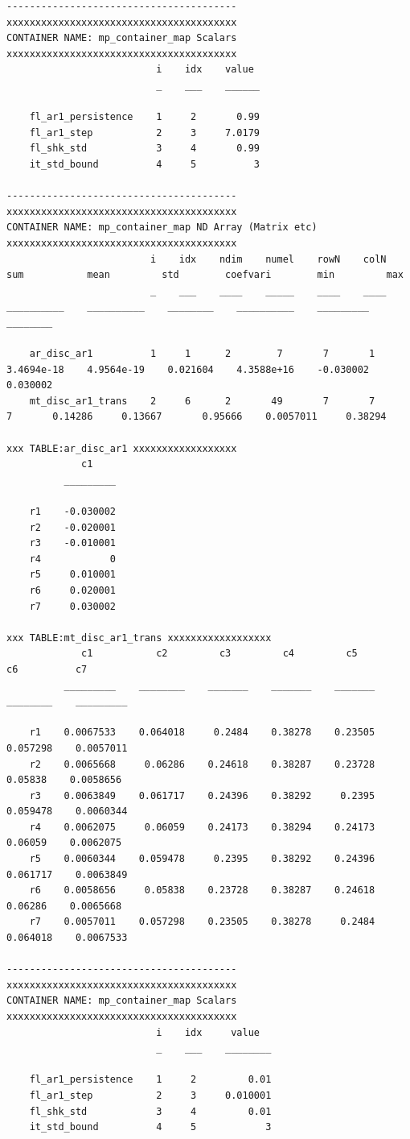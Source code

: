 \documentclass[
]{book}
\begin{document}
\begin{verbatim}
----------------------------------------
xxxxxxxxxxxxxxxxxxxxxxxxxxxxxxxxxxxxxxxx
CONTAINER NAME: mp_container_map Scalars
xxxxxxxxxxxxxxxxxxxxxxxxxxxxxxxxxxxxxxxx
                          i    idx    value 
                          _    ___    ______

    fl_ar1_persistence    1     2       0.99
    fl_ar1_step           2     3     7.0179
    fl_shk_std            3     4       0.99
    it_std_bound          4     5          3

----------------------------------------
xxxxxxxxxxxxxxxxxxxxxxxxxxxxxxxxxxxxxxxx
CONTAINER NAME: mp_container_map ND Array (Matrix etc)
xxxxxxxxxxxxxxxxxxxxxxxxxxxxxxxxxxxxxxxx
                         i    idx    ndim    numel    rowN    colN       sum           mean         std        coefvari        min         max   
                         _    ___    ____    _____    ____    ____    __________    __________    ________    __________    _________    ________

    ar_disc_ar1          1     1      2        7       7       1      3.4694e-18    4.9564e-19    0.021604    4.3588e+16    -0.030002    0.030002
    mt_disc_ar1_trans    2     6      2       49       7       7               7       0.14286     0.13667       0.95666    0.0057011     0.38294

xxx TABLE:ar_disc_ar1 xxxxxxxxxxxxxxxxxx
             c1    
          _________

    r1    -0.030002
    r2    -0.020001
    r3    -0.010001
    r4            0
    r5     0.010001
    r6     0.020001
    r7     0.030002

xxx TABLE:mt_disc_ar1_trans xxxxxxxxxxxxxxxxxx
             c1           c2         c3         c4         c5          c6          c7    
          _________    ________    _______    _______    _______    ________    _________

    r1    0.0067533    0.064018     0.2484    0.38278    0.23505    0.057298    0.0057011
    r2    0.0065668     0.06286    0.24618    0.38287    0.23728     0.05838    0.0058656
    r3    0.0063849    0.061717    0.24396    0.38292     0.2395    0.059478    0.0060344
    r4    0.0062075     0.06059    0.24173    0.38294    0.24173     0.06059    0.0062075
    r5    0.0060344    0.059478     0.2395    0.38292    0.24396    0.061717    0.0063849
    r6    0.0058656     0.05838    0.23728    0.38287    0.24618     0.06286    0.0065668
    r7    0.0057011    0.057298    0.23505    0.38278     0.2484    0.064018    0.0067533

----------------------------------------
xxxxxxxxxxxxxxxxxxxxxxxxxxxxxxxxxxxxxxxx
CONTAINER NAME: mp_container_map Scalars
xxxxxxxxxxxxxxxxxxxxxxxxxxxxxxxxxxxxxxxx
                          i    idx     value  
                          _    ___    ________

    fl_ar1_persistence    1     2         0.01
    fl_ar1_step           2     3     0.010001
    fl_shk_std            3     4         0.01
    it_std_bound          4     5            3
\end{verbatim}
\end{document}
